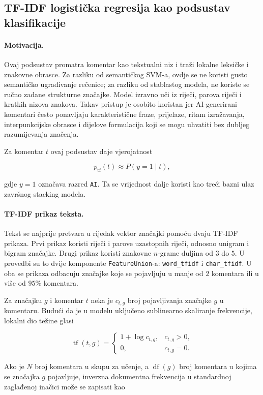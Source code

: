 \subsection{TF-IDF logistička regresija kao podsustav klasifikacije}

\paragraph{Motivacija.}
Ovaj podsustav promatra komentar kao tekstualni niz i traži lokalne leksičke i znakovne obrasce. Za razliku od semantičkog SVM-a, ovdje se ne koristi gusto semantičko ugrađivanje rečenice; za razliku od stablastog modela, ne koriste se ručno zadane strukturne značajke. Model izravno uči iz riječi, parova riječi i kratkih nizova znakova. Takav pristup je osobito koristan jer AI-generirani komentari često ponavljaju karakteristične fraze, prijelaze, ritam izražavanja, interpunkcijske obrasce i dijelove formulacija koji se mogu uhvatiti bez dubljeg razumijevanja značenja.

Za komentar $t$ ovaj podsustav daje vjerojatnost

\[
p_{\mathrm{tf}}(t) \approx P(y=1\mid t),
\]

gdje $y=1$ označava razred \texttt{AI}. Ta se vrijednost dalje koristi kao treći bazni ulaz završnog stacking modela.

\paragraph{TF-IDF prikaz teksta.}
Tekst se najprije pretvara u rijedak vektor značajki pomoću dvaju TF-IDF prikaza. Prvi prikaz koristi riječi i parove uzastopnih riječi, odnosno unigram i bigram značajke. Drugi prikaz koristi znakovne $n$-grame duljina od $3$ do $5$. U provedbi su to dvije komponente \texttt{FeatureUnion}-a: \texttt{word\_tfidf} i \texttt{char\_tfidf}. U oba se prikaza odbacuju značajke koje se pojavljuju u manje od $2$ komentara ili u više od $95\%$ komentara.

Za značajku $g$ i komentar $t$ neka je $c_{t,g}$ broj pojavljivanja značajke $g$ u komentaru. Budući da je u modelu uključeno sublinearno skaliranje frekvencije, lokalni dio težine glasi

\[
\operatorname{tf}(t,g)=
\begin{cases}
1+\log c_{t,g}, & c_{t,g}>0,\\
0, & c_{t,g}=0.
\end{cases}
\]

Ako je $N$ broj komentara u skupu za učenje, a $\operatorname{df}(g)$ broj komentara u kojima se značajka $g$ pojavljuje, inverzna dokumentna frekvencija u standardnoj zaglađenoj inačici može se zapisati kao

